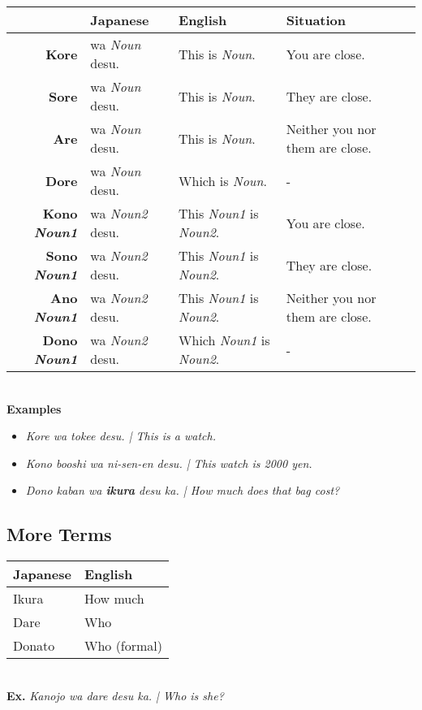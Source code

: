 \documentclass{article}
\begin{document}
\begin{CJK}{UTF8}{min}
\begin{tabular}{ r l | l | l }
& Japanese & English & Situation\\
\hline
{\bf Kore}& wa {\it Noun} desu. & This is {\it Noun}. & You are close.\\
{\bf Sore} & wa {\it Noun} desu. & This is {\it Noun}. & They are close.\\
{\bf Are} & wa {\it Noun} desu. & This is {\it Noun}. & Neither you nor them are close.\\
{\bf Dore} & wa {\it Noun} desu. & Which is {\it Noun}. & -\\
\hline
{\bf Kono {\it Noun1}}& wa {\it Noun2} desu. & This {\it Noun1} is {\it Noun2}. & You are close.\\
{\bf Sono {\it Noun1}} & wa {\it Noun2} desu. & This {\it Noun1} is {\it Noun2}. & They are close.\\
{\bf Ano {\it Noun1}} & wa {\it Noun2} desu. & This {\it Noun1} is {\it Noun2}. & Neither you nor them are close.\\
{\bf Dono {\it Noun1}} & wa {\it Noun2} desu. & Which {\it Noun1} is {\it Noun2}. & -
\end{tabular}\\

{\bf Examples}
\begin{itemize}
\item {\it Kore wa tokee desu. | This is a watch.}
\item {\it Kono booshi wa ni-sen-en desu. | This watch is 2000 yen.}
\item {\it Dono kaban wa {\bf ikura} desu ka. | How much does that bag cost?}
\end{itemize}


\subsection{More Terms}

\begin{tabular}{ l | l }
Japanese & English\\
\hline
Ikura & How much\\
Dare & Who\\
Donato & Who (formal)
\end{tabular}\\

{\bf Ex.} {\it Kanojo wa dare desu ka. | Who is she?}\\


\end{CJK}
\end{document}
